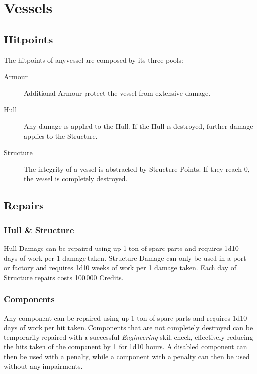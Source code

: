 \chapter{Vessels}
\label{chap:Vessels}

\section{Hitpoints}
\label{sec:Hitpoints}

The hitpoints of anyvessel are composed by its three pools:
\begin{description}
  \item[Armour] Additional Armour protect the vessel from extensive damage.
  \item[Hull] Any damage is applied to the Hull. If the Hull is destroyed, further damage applies to the Structure.
  \item[Structure] The integrity of a vessel is abstracted by Structure Points. If they reach 0, the vessel is completely destroyed.
\end{description}

\section{Repairs}
\label{sec:Repairs}

\subsection{Hull \& Structure}

Hull Damage can be repaired using up 1 ton of spare parts and requires 1d10 days of work per 1 damage taken.
Structure Damage can only be used in a port or factory and requires 1d10 weeks of work per 1 damage taken. Each day of Structure repairs costs 100.000 Credits.

\subsection{Components}
\label{sub:Components}

Any component can be repaired using up 1 ton of spare parts and requires 1d10 days of work per hit taken. Components that are not completely destroyed can be temporarily repaired with a successful \emph{Engineering} skill check, effectively reducing the hits taken of the component by 1 for 1d10 hours. A disabled component can then be used with a penalty, while a component with a penalty can then be used without any impairments.

